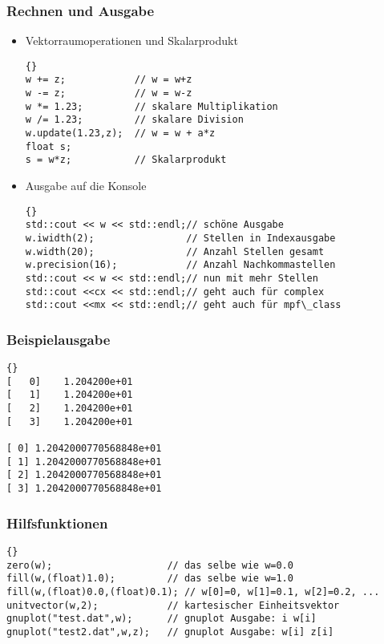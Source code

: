 \begin{frame}[fragile]
\frametitle{Rechnen und Ausgabe}
\begin{itemize}
\item Vektorraumoperationen und Skalarprodukt\\
{\footnotesize{\begin{lstlisting}{}
w += z;            // w = w+z
w -= z;            // w = w-z
w *= 1.23;         // skalare Multiplikation
w /= 1.23;         // skalare Division
w.update(1.23,z);  // w = w + a*z
float s;
s = w*z;           // Skalarprodukt
\end{lstlisting}}}
\item Ausgabe auf die Konsole\\
{\footnotesize{\begin{lstlisting}{}
std::cout << w << std::endl;// schöne Ausgabe
w.iwidth(2);                // Stellen in Indexausgabe
w.width(20);                // Anzahl Stellen gesamt
w.precision(16);            // Anzahl Nachkommastellen
std::cout << w << std::endl;// nun mit mehr Stellen
std::cout <<cx << std::endl;// geht auch für complex
std::cout <<mx << std::endl;// geht auch für mpf\_class
\end{lstlisting}}}
\end{itemize}
\end{frame}

\begin{frame}[fragile]
\frametitle{Beispielausgabe}
{\footnotesize{\begin{lstlisting}{}
[   0]    1.204200e+01
[   1]    1.204200e+01
[   2]    1.204200e+01
[   3]    1.204200e+01

[ 0] 1.2042000770568848e+01
[ 1] 1.2042000770568848e+01
[ 2] 1.2042000770568848e+01
[ 3] 1.2042000770568848e+01
\end{lstlisting}}}
\end{frame}

\begin{frame}[fragile]
\frametitle{Hilfsfunktionen}
{\footnotesize{\begin{lstlisting}{}
zero(w);                    // das selbe wie w=0.0
fill(w,(float)1.0);         // das selbe wie w=1.0
fill(w,(float)0.0,(float)0.1); // w[0]=0, w[1]=0.1, w[2]=0.2, ...
unitvector(w,2);            // kartesischer Einheitsvektor
gnuplot("test.dat",w);      // gnuplot Ausgabe: i w[i]
gnuplot("test2.dat",w,z);   // gnuplot Ausgabe: w[i] z[i]
\end{lstlisting}}}
\end{frame}

